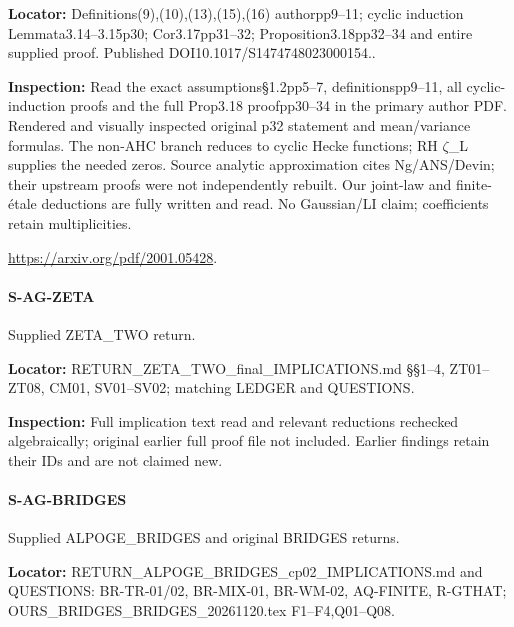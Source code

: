 \documentclass[11pt,a4paper]{article}
\begin{document}
\textbf{Locator:} Definitions(9),(10),(13),(15),(16) authorpp9–\allowbreak{}11; cyclic induction Lemmata3.\allowbreak{}14–\allowbreak{}3.\allowbreak{}15p30; Cor3.\allowbreak{}17pp31–\allowbreak{}32; Proposition3.\allowbreak{}18pp32–\allowbreak{}34 and entire supplied proof.\allowbreak{} Published DOI10.\allowbreak{}1017/\allowbreak{}S1474748023000154.\allowbreak{}.

\textbf{Inspection:} Read the exact assumptions§1.\allowbreak{}2pp5–\allowbreak{}7, definitionspp9–\allowbreak{}11, all cyclic-induction proofs and the full Prop3.\allowbreak{}18 proofpp30–\allowbreak{}34 in the primary author PDF.\allowbreak{} Rendered and visually inspected original p32 statement and mean/\allowbreak{}variance formulas.\allowbreak{} The non-AHC branch reduces to cyclic Hecke functions; RH \ensuremath{\zeta}\_\allowbreak{}L supplies the needed zeros.\allowbreak{} Source analytic approximation cites Ng/\allowbreak{}ANS/\allowbreak{}Devin; their upstream proofs were not independently rebuilt.\allowbreak{} Our joint-law and finite-étale deductions are fully written and read.\allowbreak{} No Gaussian/\allowbreak{}LI claim; coefficients retain multiplicities.\allowbreak{}

\url{https://arxiv.org/pdf/2001.05428}.

\paragraph{S-AG-ZETA} Supplied ZETA\_\allowbreak{}TWO return.

\textbf{Locator:} RETURN\_\allowbreak{}ZETA\_\allowbreak{}TWO\_\allowbreak{}final\_\allowbreak{}IMPLICATIONS.\allowbreak{}md §§1–\allowbreak{}4, ZT01–\allowbreak{}ZT08, CM01, SV01–\allowbreak{}SV02; matching LEDGER and QUESTIONS.

\textbf{Inspection:} Full implication text read and relevant reductions rechecked algebraically; original earlier full proof file not included.\allowbreak{} Earlier findings retain their IDs and are not claimed new.\allowbreak{}


\paragraph{S-AG-BRIDGES} Supplied ALPOGE\_\allowbreak{}BRIDGES and original BRIDGES returns.

\textbf{Locator:} RETURN\_\allowbreak{}ALPOGE\_\allowbreak{}BRIDGES\_\allowbreak{}cp02\_\allowbreak{}IMPLICATIONS.\allowbreak{}md and QUESTIONS:\allowbreak{} BR-TR-01/\allowbreak{}02, BR-MIX-01, BR-WM-02, AQ-FINITE, R-GTHAT; OURS\_\allowbreak{}BRIDGES\_\allowbreak{}BRIDGES\_\allowbreak{}20261120.\allowbreak{}tex F1–\allowbreak{}F4,Q01–\allowbreak{}Q08.
\end{document}
